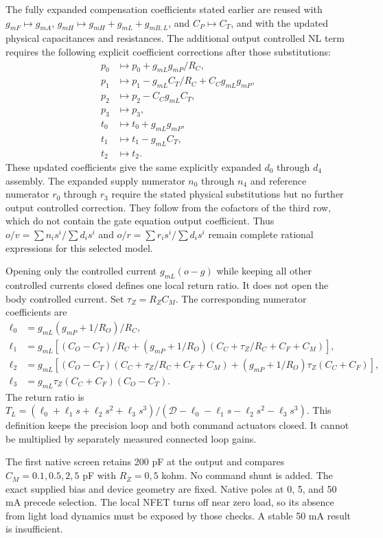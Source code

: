 The fully expanded compensation coefficients stated earlier are reused with $g_{mF}\mapsto g_{mA}$, $g_{mH}\mapsto g_{mH}+g_{mL}+g_{mB,L}$, and $C_P\mapsto C_T$, and with the updated physical capacitances and resistances. The additional output controlled NL term requires the following explicit coefficient corrections after those substitutions:
\begin{align}
 p_0&\mapsto p_0+g_{mL}g_{mP}/R_C,\\
 p_1&\mapsto p_1-g_{mL}C_T/R_C+C_Cg_{mL}g_{mP},\\
 p_2&\mapsto p_2-C_Cg_{mL}C_T,\\
 p_3&\mapsto p_3,\\
 t_0&\mapsto t_0+g_{mL}g_{mP},\\
 t_1&\mapsto t_1-g_{mL}C_T,\\
 t_2&\mapsto t_2.
\end{align}
These updated coefficients give the same explicitly expanded $d_0$ through $d_4$ assembly. The expanded supply numerator $n_0$ through $n_4$ and reference numerator $r_0$ through $r_3$ require the stated physical substitutions but no further output controlled correction. They follow from the cofactors of the third row, which do not contain the gate equation output coefficient. Thus $o/v=\sum n_is^i/\sum d_is^i$ and $o/r=\sum r_is^i/\sum d_is^i$ remain complete rational expressions for this selected model.

Opening only the controlled current $g_{mL}(o-g)$ while keeping all other controlled currents closed defines one local return ratio. It does not open the body controlled current. Set $\tau_Z=R_ZC_M$. The corresponding numerator coefficients are
\begin{align}
 \ell_0&=g_{mL}(g_{mP}+1/R_O)/R_C,\\
 \ell_1&=g_{mL}\left[(C_O-C_T)/R_C+(g_{mP}+1/R_O)(C_C+\tau_Z/R_C+C_F+C_M)\right],\\
 \ell_2&=g_{mL}\left[(C_O-C_T)(C_C+\tau_Z/R_C+C_F+C_M)
 +(g_{mP}+1/R_O)\tau_Z(C_C+C_F)\right],\\
 \ell_3&=g_{mL}\tau_Z(C_C+C_F)(C_O-C_T).
\end{align}
The return ratio is $T_L=(\ell_0+\ell_1s+\ell_2s^2+\ell_3s^3)/(\mathcal D-\ell_0-\ell_1s-\ell_2s^2-\ell_3s^3)$. This definition keeps the precision loop and both command actuators closed. It cannot be multiplied by separately measured connected loop gains.

The first native screen retains 200 pF at the output and compares $C_M=0.1,0.5,2,5$ pF with $R_Z=0,5$ kohm. No command shunt is added. The exact supplied bias and device geometry are fixed. Native poles at 0, 5, and 50 mA precede selection. The local NFET turns off near zero load, so its absence from light load dynamics must be exposed by those checks. A stable 50 mA result is insufficient.


